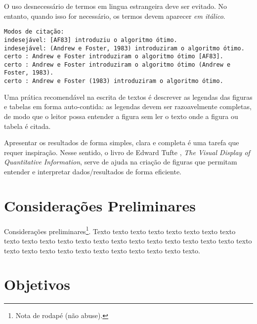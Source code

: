 O uso desnecessário de termos em lingua estrangeira deve ser evitado. No entanto,
quando isso for necessário, os termos devem aparecer \emph{em itálico}.

\begin{small}
\begin{verbatim}
Modos de citação:
indesejável: [AF83] introduziu o algoritmo ótimo.
indesejável: (Andrew e Foster, 1983) introduziram o algoritmo ótimo.
certo : Andrew e Foster introduziram o algoritmo ótimo [AF83].
certo : Andrew e Foster introduziram o algoritmo ótimo (Andrew e Foster, 1983).
certo : Andrew e Foster (1983) introduziram o algoritmo ótimo.
\end{verbatim}
\end{small}

Uma prática recomendável na escrita de textos é descrever as legendas das
figuras e tabelas em forma auto-contida: as legendas devem ser razoavelmente
completas, de modo que o leitor possa entender a figura sem ler o texto onde a
figura ou tabela é citada.  

Apresentar os resultados de forma simples, clara e completa é uma tarefa que
requer inspiração. Nesse sentido, o livro de Edward Tufte \cite{tufte01:visualDisplay},
\emph{The Visual Display of Quantitative Information}, serve de ajuda na 
criação de figuras que permitam entender e interpretar dados/resultados de forma
eficiente.




\section{Considerações Preliminares}
\label{sec:consideracoes_preliminares}

Considerações preliminares\footnote{Nota de rodapé (não abuse).}.
Texto texto texto texto texto texto texto texto texto texto texto texto texto
texto texto texto texto texto texto texto texto texto texto texto texto texto
texto texto texto texto texto texto texto.
 

\section{Objetivos}
\label{sec:objetivo}

